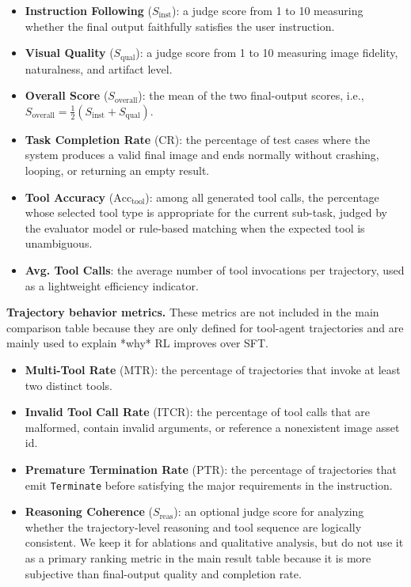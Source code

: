 \documentclass{article}
\begin{document}
\begin{itemize}
    \item \textbf{Instruction Following} ($S_{\text{inst}}$): a judge score from 1 to 10 measuring whether the final output faithfully satisfies the user instruction.
    \item \textbf{Visual Quality} ($S_{\text{qual}}$): a judge score from 1 to 10 measuring image fidelity, naturalness, and artifact level.
    \item \textbf{Overall Score} ($S_{\text{overall}}$): the mean of the two final-output scores, i.e., $S_{\text{overall}} = \frac{1}{2}(S_{\text{inst}} + S_{\text{qual}})$.
    \item \textbf{Task Completion Rate} ($\text{CR}$): the percentage of test cases where the system produces a valid final image and ends normally without crashing, looping, or returning an empty result.
    \item \textbf{Tool Accuracy} ($\text{Acc}_{\text{tool}}$): among all generated tool calls, the percentage whose selected tool type is appropriate for the current sub-task, judged by the evaluator model or rule-based matching when the expected tool is unambiguous.
    \item \textbf{Avg. Tool Calls}: the average number of tool invocations per trajectory, used as a lightweight efficiency indicator.
\end{itemize}

\textbf{Trajectory behavior metrics.} These metrics are not included in the main comparison table because they are only defined for tool-agent trajectories and are mainly used to explain *why* RL improves over SFT.

\begin{itemize}
    \item \textbf{Multi-Tool Rate} ($\text{MTR}$): the percentage of trajectories that invoke at least two distinct tools.
    \item \textbf{Invalid Tool Call Rate} ($\text{ITCR}$): the percentage of tool calls that are malformed, contain invalid arguments, or reference a nonexistent image asset id.
    \item \textbf{Premature Termination Rate} ($\text{PTR}$): the percentage of trajectories that emit \texttt{Terminate} before satisfying the major requirements in the instruction.
    \item \textbf{Reasoning Coherence} ($S_{\text{reas}}$): an optional judge score for analyzing whether the trajectory-level reasoning and tool sequence are logically consistent. We keep it for ablations and qualitative analysis, but do not use it as a primary ranking metric in the main result table because it is more subjective than final-output quality and completion rate.
\end{itemize}
\end{document}
